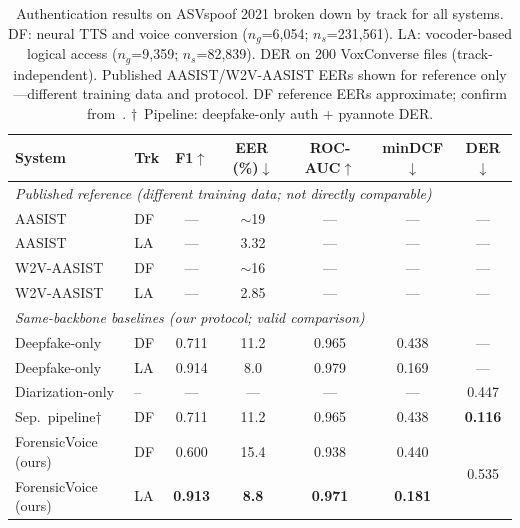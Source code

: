 \documentclass{article}
\newcommand{\fv}{ForensicVoice}
\begin{document}
\begin{table}[t]
  \caption{
    Authentication results on ASVspoof 2021 broken down by track for all
    systems. DF: neural TTS and voice conversion ($n_g$=6{,}054;
    $n_s$=231{,}561). LA: vocoder-based logical access ($n_g$=9{,}359;
    $n_s$=82{,}839). DER on 200 VoxConverse files (track-independent).
    Published AASIST/W2V-AASIST EERs shown for reference only---different
    training data and protocol. DF reference EERs approximate; confirm
    from~\citet{liu2021asvspoof}.
    $\dagger$~Pipeline: deepfake-only auth + pyannote DER.
  }
  \label{tab:main}
  \centering
  \small
  \setlength{\tabcolsep}{4pt}
  \begin{tabular}{llccccc}
    \toprule
    \textbf{System} & \textbf{Trk} & \textbf{F1}$\uparrow$
      & \textbf{EER\,(\%)}$\downarrow$ & \textbf{ROC-AUC}$\uparrow$
      & \textbf{minDCF}$\downarrow$ & \textbf{DER}$\downarrow$ \\
    \midrule
    \multicolumn{7}{l}{\textit{Published reference (different training data; not directly comparable)}} \\
    AASIST~\citep{jung2022aasist}       & DF & --- & $\sim$19 & --- & --- & --- \\
    AASIST~\citep{jung2022aasist}       & LA & --- & 3.32     & --- & --- & --- \\
    W2V-AASIST~\citep{tak2022w2vaasist} & DF & --- & $\sim$16 & --- & --- & --- \\
    W2V-AASIST~\citep{tak2022w2vaasist} & LA & --- & 2.85     & --- & --- & --- \\
    \midrule
    \multicolumn{7}{l}{\textit{Same-backbone baselines (our protocol; valid comparison)}} \\
    Deepfake-only            & DF & 0.711 & 11.2 & 0.965 & 0.438 & ---   \\
    Deepfake-only            & LA & 0.914 &  8.0 & 0.979 & 0.169 & ---   \\
    Diarization-only         & -- & ---   & ---  & ---   & ---   & 0.447 \\
    Sep.\ pipeline$\dagger$  & DF & 0.711 & 11.2 & 0.965 & 0.438 & \textbf{0.116} \\
    \midrule
    \fv{} (ours) & DF & 0.600          & 15.4          & 0.938          & 0.440          & \multirow{2}{*}{0.535} \\
    \fv{} (ours) & LA & \textbf{0.913} & \textbf{8.8}  & \textbf{0.971} & \textbf{0.181} & \\
    \bottomrule
  \end{tabular}
\end{table}
\end{document}
